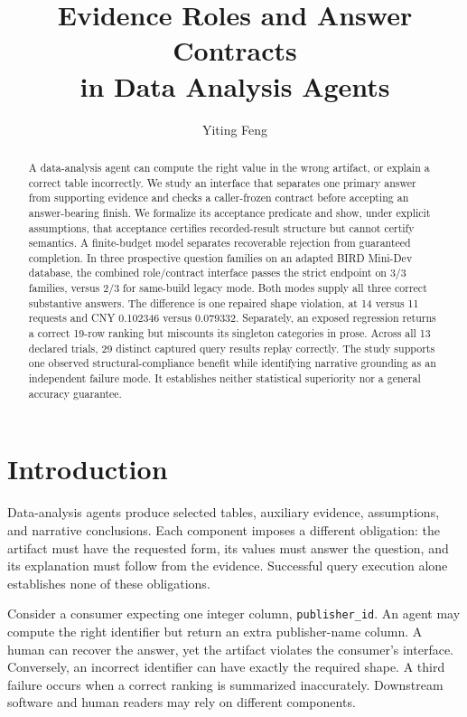 \documentclass{article}
\title{Evidence Roles and Answer Contracts\\in Data Analysis Agents}
\author{Yiting Feng}
\newcommand{\code}[1]{\texttt{#1}}
\begin{document}
\maketitle

\begin{abstract}
A data-analysis agent can compute the right value in the wrong artifact, or explain a correct table incorrectly. We study an interface that separates one primary answer from supporting evidence and checks a caller-frozen contract before accepting an answer-bearing finish. We formalize its acceptance predicate and show, under explicit assumptions, that acceptance certifies recorded-result structure but cannot certify semantics. A finite-budget model separates recoverable rejection from guaranteed completion. In three prospective question families on an adapted BIRD Mini-Dev database, the combined role/contract interface passes the strict endpoint on 3/3 families, versus 2/3 for same-build legacy mode. Both modes supply all three correct substantive answers. The difference is one repaired shape violation, at 14 versus 11 requests and CNY 0.102346 versus 0.079332. Separately, an exposed regression returns a correct 19-row ranking but miscounts its singleton categories in prose. Across all 13 declared trials, 29 distinct captured query results replay correctly. The study supports one observed structural-compliance benefit while identifying narrative grounding as an independent failure mode. It establishes neither statistical superiority nor a general accuracy guarantee.
\end{abstract}

\section{Introduction}
Data-analysis agents produce selected tables, auxiliary evidence, assumptions, and narrative conclusions. Each component imposes a different obligation: the artifact must have the requested form, its values must answer the question, and its explanation must follow from the evidence. Successful query execution alone establishes none of these obligations.

Consider a consumer expecting one integer column, \code{publisher\_id}. An agent may compute the right identifier but return an extra publisher-name column. A human can recover the answer, yet the artifact violates the consumer's interface. Conversely, an incorrect identifier can have exactly the required shape. A third failure occurs when a correct ranking is summarized inaccurately. Downstream software and human readers may rely on different components.
\end{document}
